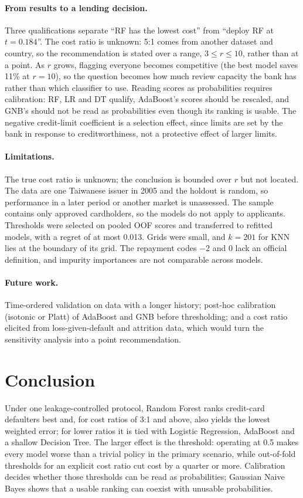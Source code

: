 \documentclass{article}
\begin{document}
\paragraph{From results to a lending decision.} Three qualifications separate ``RF has the lowest cost'' from ``deploy RF at $t=0.184$''. The cost ratio is unknown: 5:1 comes from another dataset and country, so the recommendation is stated over a range, $3\le r\le10$, rather than at a point. As $r$ grows, flagging everyone becomes competitive (the best model saves 11\% at $r=10$), so the question becomes how much review capacity the bank has rather than which classifier to use. Reading scores as probabilities requires calibration: RF, LR and DT qualify, AdaBoost's scores should be rescaled, and GNB's should not be read as probabilities even though its ranking is usable. The negative credit-limit coefficient is a selection effect, since limits are set by the bank in response to creditworthiness, not a protective effect of larger limits.

\paragraph{Limitations.} The true cost ratio is unknown; the conclusion is bounded over $r$ but not located. The data are one Taiwanese issuer in 2005 and the holdout is random, so performance in a later period or another market is unassessed. The sample contains only approved cardholders, so the models do not apply to applicants. Thresholds were selected on pooled OOF scores and transferred to refitted models, with a regret of at most 0.013. Grids were small, and $k=201$ for KNN lies at the boundary of its grid. The repayment codes $-2$ and 0 lack an official definition, and impurity importances are not comparable across models.

\paragraph{Future work.} Time-ordered validation on data with a longer history; post-hoc calibration (isotonic or Platt) of AdaBoost and GNB before thresholding; and a cost ratio elicited from loss-given-default and attrition data, which would turn the sensitivity analysis into a point recommendation.

\section{Conclusion}
Under one leakage-controlled protocol, Random Forest ranks credit-card defaulters best and, for cost ratios of 3:1 and above, also yields the lowest weighted error; for lower ratios it is tied with Logistic Regression, AdaBoost and a shallow Decision Tree. The larger effect is the threshold: operating at 0.5 makes every model worse than a trivial policy in the primary scenario, while out-of-fold thresholds for an explicit cost ratio cut cost by a quarter or more. Calibration decides whether those thresholds can be read as probabilities; Gaussian Naive Bayes shows that a usable ranking can coexist with unusable probabilities.
\end{document}

